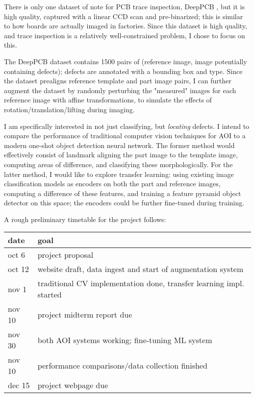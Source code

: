 \documentclass{article}
\begin{document}
There is only one dataset of note for PCB trace inspection, DeepPCB \cite{tang2019online}, but it is high quality, captured with a linear CCD scan and pre-binarized; this is similar to how boards are actually imaged in factories. Since this dataset is high quality, and trace inspection is a relatively well-constrained problem, I chose to focus on this.

The DeepPCB dataset contains 1500 pairs of (reference image, image potentially containing defects); defects are annotated with a bounding box and type. Since the dataset prealigns reference template and part image pairs, I can further augment the dataset by randomly perturbing the "measured" images for each reference image with affine transformations, to simulate the effects of rotation/translation/lifting during imaging.

I am specifically interested in not just classifying, but \emph{locating} defects. I intend to compare the performance of traditional computer vision techniques for AOI to a modern one-shot object detection neural network. The former method would effectively consist of landmark aligning the part image to the template image, computing areas of difference, and classifying these morphologically. For the latter method, I would like to explore transfer learning: using existing image classification models as encoders on both the part and reference images, computing a difference of these features, and training a feature pyramid object detector on this space; the encoders could be further fine-tuned during training.


A rough preliminary timetable for the project follows: \\
\begin{tabular}{l|l}
    \textbf{date} & \textbf{goal} \\
    \hline
    oct 6 & project proposal \\
    oct 12 & website draft, data ingest and start of augmentation system \\
    nov 1 & traditional CV implementation done, transfer learning impl. started \\
    nov 10 & project midterm report due \\
    nov 30 & both AOI systems working; fine-tuning ML system \\
    nov 10 & performance comparisons/data collection finished \\
    dec 15 & project webpage due \\
\end{tabular}

\printbibliography
\end{document}
